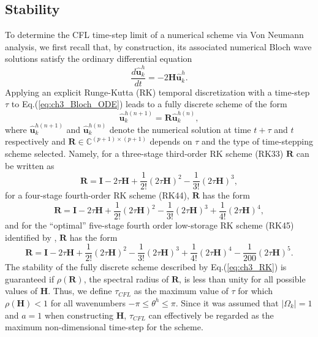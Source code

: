 \documentclass[preprint,12pt]{elsarticle}
\begin{document}
\subsection{Stability}
To determine the CFL time-step limit of a numerical scheme via Von Neumann analysis, we first recall that, by construction, its associated numerical Bloch wave solutions satisfy the ordinary differential equation
\begin{equation}
    \frac{d\hat{\mathbf{u}}_k^h}{dt} = -2\mathbf{H} \hat{\mathbf{u}}_k^h.
    \label{eq:ch3_Bloch_ODE}
\end{equation}
Applying an explicit Runge-Kutta (RK) temporal discretization with a time-step $\tau$ to Eq.(\ref{eq:ch3_Bloch_ODE}) leads to a fully discrete scheme of the form
\begin{equation}
    \hat{\mathbf{u}}_k^{h(n+1)} = \mathbf{R} \hat{\mathbf{u}}_k^{h(n)},
    \label{eq:ch3_RK}
\end{equation}
where $\hat{\mathbf{u}}_k^{h(n+1)}$ and $\hat{\mathbf{u}}_k^{h(n)}$ denote the numerical solution at time $t+\tau$ and $t$ respectively and $\mathbf{R} \in \mathbb{C}^{(p+1)\times(p+1)}$ depends on $\tau$ and the type of time-stepping scheme selected. Namely, for a three-stage third-order RK scheme (RK33) $\mathbf{R}$ can be written as \citep{carpenter1994fourth}
\begin{equation}
    \mathbf{R} = \mathbf{I} - 2\tau \mathbf{H} + \frac{1}{2!} (2\tau\mathbf{H})^2 - \frac{1}{3!}(2\tau \mathbf{H})^3,
    \label{eq:ch3_RK33}
\end{equation}
for a four-stage fourth-order RK scheme (RK44), $\mathbf{R}$ has the form \citep{carpenter1994fourth}
\begin{equation}
    \mathbf{R} = \mathbf{I} - 2\tau \mathbf{H} + \frac{1}{2!} (2\tau\mathbf{H})^2 - \frac{1}{3!}(2\tau \mathbf{H})^3 + \frac{1}{4!}(2\tau \mathbf{H})^4,
    \label{eq:ch3_RK44}
\end{equation}
and for the ``optimal'' five-stage fourth order low-storage RK scheme (RK45) identified by \cite{carpenter1994fourth}, $\mathbf{R}$ has the form
\begin{equation}
    \mathbf{R} = \mathbf{I} - 2\tau \mathbf{H} + \frac{1}{2!} (2\tau\mathbf{H})^2 - \frac{1}{3!}(2\tau \mathbf{H})^3 + \frac{1}{4!}(2\tau \mathbf{H})^4 - \frac{1}{200}(2\tau \mathbf{H})^5.
    \label{eq:ch3_RK45}
\end{equation}
The stability of the fully discrete scheme described by Eq.(\ref{eq:ch3_RK}) is guaranteed if $\rho(\mathbf{R})$, the spectral radius of $\mathbf{R}$, is less than unity for all possible values of $\mathbf{H}$. Thus, we define $\tau_{CFL}$ as the maximum value of $\tau$ for which $\rho(\mathbf{H}) < 1$ for all wavenumbers $-\pi \leq \theta^h \leq \pi$. Since it was assumed that $|\Omega_k|=1$ and $a=1$ when constructing $\mathbf{H}$, $\tau_{CFL}$ can effectively be regarded as the maximum non-dimensional time-step for the scheme.
\end{document}
